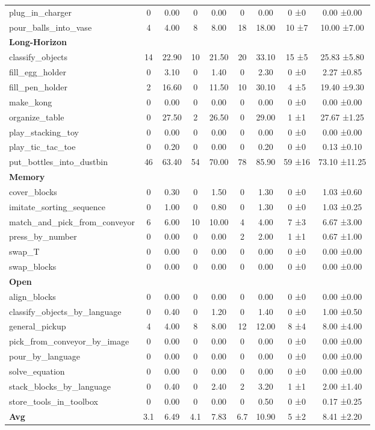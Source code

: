 \begin{table}[H]
{\begin{tabular}{l|c|c|c|c|c|c|c|c}
plug\_in\_charger & 0 & 0.00 & 0 & 0.00 & 0 & 0.00 & 0 ±0 & 0.00 ±0.00 \\
pour\_balls\_into\_vase & 4 & 4.00 & 8 & 8.00 & 18 & 18.00 & 10 ±7 & 10.00 ±7.00 \\
\hline
\multicolumn{9}{l}{\textbf{Long-Horizon}} \\
classify\_objects & 14 & 22.90 & 10 & 21.50 & 20 & 33.10 & 15 ±5 & 25.83 ±5.80 \\
fill\_egg\_holder & 0 & 3.10 & 0 & 1.40 & 0 & 2.30 & 0 ±0 & 2.27 ±0.85 \\
fill\_pen\_holder & 2 & 16.60 & 0 & 11.50 & 10 & 30.10 & 4 ±5 & 19.40 ±9.30 \\
make\_kong & 0 & 0.00 & 0 & 0.00 & 0 & 0.00 & 0 ±0 & 0.00 ±0.00 \\
organize\_table & 0 & 27.50 & 2 & 26.50 & 0 & 29.00 & 1 ±1 & 27.67 ±1.25 \\
play\_stacking\_toy & 0 & 0.00 & 0 & 0.00 & 0 & 0.00 & 0 ±0 & 0.00 ±0.00 \\
play\_tic\_tac\_toe & 0 & 0.20 & 0 & 0.00 & 0 & 0.20 & 0 ±0 & 0.13 ±0.10 \\
put\_bottles\_into\_dustbin & 46 & 63.40 & 54 & 70.00 & 78 & 85.90 & 59 ±16 & 73.10 ±11.25 \\
\hline
\multicolumn{9}{l}{\textbf{Memory}} \\
cover\_blocks & 0 & 0.30 & 0 & 1.50 & 0 & 1.30 & 0 ±0 & 1.03 ±0.60 \\
imitate\_sorting\_sequence & 0 & 1.00 & 0 & 0.80 & 0 & 1.30 & 0 ±0 & 1.03 ±0.25 \\
match\_and\_pick\_from\_conveyor & 6 & 6.00 & 10 & 10.00 & 4 & 4.00 & 7 ±3 & 6.67 ±3.00 \\
press\_by\_number & 0 & 0.00 & 0 & 0.00 & 2 & 2.00 & 1 ±1 & 0.67 ±1.00 \\
swap\_T & 0 & 0.00 & 0 & 0.00 & 0 & 0.00 & 0 ±0 & 0.00 ±0.00 \\
swap\_blocks & 0 & 0.00 & 0 & 0.00 & 0 & 0.00 & 0 ±0 & 0.00 ±0.00 \\
\hline
\multicolumn{9}{l}{\textbf{Open}} \\
align\_blocks & 0 & 0.00 & 0 & 0.00 & 0 & 0.00 & 0 ±0 & 0.00 ±0.00 \\
classify\_objects\_by\_language & 0 & 0.40 & 0 & 1.20 & 0 & 1.40 & 0 ±0 & 1.00 ±0.50 \\
general\_pickup & 4 & 4.00 & 8 & 8.00 & 12 & 12.00 & 8 ±4 & 8.00 ±4.00 \\
pick\_from\_conveyor\_by\_image & 0 & 0.00 & 0 & 0.00 & 0 & 0.00 & 0 ±0 & 0.00 ±0.00 \\
pour\_by\_language & 0 & 0.00 & 0 & 0.00 & 0 & 0.00 & 0 ±0 & 0.00 ±0.00 \\
solve\_equation & 0 & 0.00 & 0 & 0.00 & 0 & 0.00 & 0 ±0 & 0.00 ±0.00 \\
stack\_blocks\_by\_language & 0 & 0.40 & 0 & 2.40 & 2 & 3.20 & 1 ±1 & 2.00 ±1.40 \\
store\_tools\_in\_toolbox & 0 & 0.00 & 0 & 0.00 & 0 & 0.50 & 0 ±0 & 0.17 ±0.25 \\
\hline
\textbf{Avg} & 3.1 & 6.49 & 4.1 & 7.83 & 6.7 & 10.90 & 5 ±2 & 8.41 ±2.20 \\
\hline
\end{tabular}
}
\end{table}
